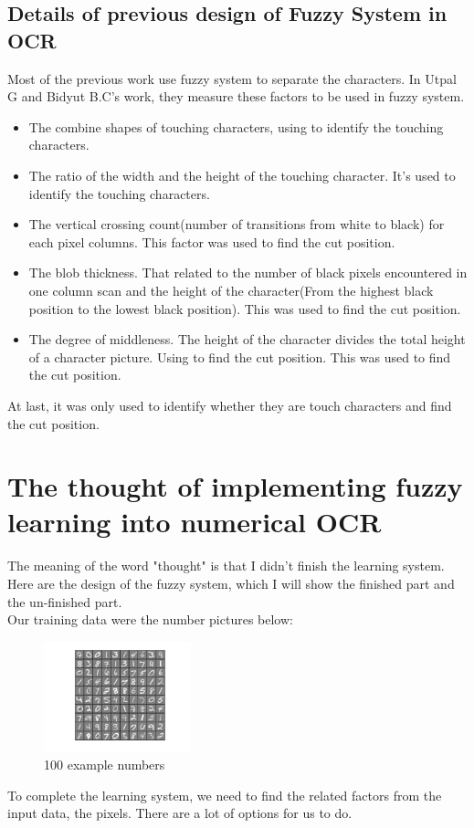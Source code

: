 \documentclass[12pt]{article} %
\begin{document}
\subsection{Details of previous design of Fuzzy System in OCR}
Most of the previous work use fuzzy system to separate the characters. In Utpal G and Bidyut B.C's work, they measure these factors to be used in fuzzy system.
\begin{itemize}
\item[\textbullet] The combine shapes of touching characters, using to identify the touching characters. 
\item[\textbullet] The ratio of the width and the height of the touching character. It's used to identify the touching characters.
\item[\textbullet] The vertical crossing count(number of transitions from white to black) for each pixel columns. This factor was used to find the cut position.
\item[\textbullet] The blob thickness. That related to the number of black pixels encountered in one column scan and the height of the character(From the highest black position to the lowest black position). This was used to find the cut position.
\item[\textbullet] The degree of middleness. The height of the character divides the total height of a character picture. Using to find the cut position. This was used to find the cut position.
\end{itemize}
At last, it was only used to identify whether they are touch characters and find the cut position.
\section{The thought of implementing fuzzy learning into numerical OCR}
The meaning of the word "thought" is that I didn't finish the learning system. Here are the design of the fuzzy system, which I will show the finished part and the un-finished part. \\
Our training data were the number pictures below:
\begin{figure}[!htb]
    \begin{center}
        \includegraphics[width=0.38\textwidth]{example}
    \end{center}
    \caption{100 example numbers}
    \label{100 example numbers}
\end{figure}
To complete the learning system, we need to find the related factors from the input data, the pixels. There are a lot of options for us to do. \\
\end{document}
